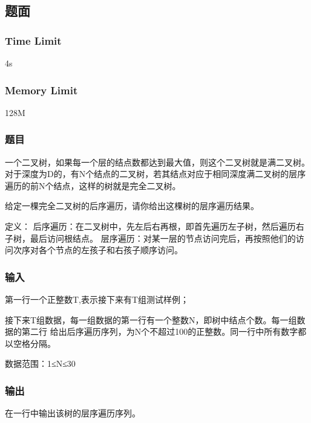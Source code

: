 \subsection{题面}

\subsubsection{Time Limit}
4s

\subsubsection{Memory Limit}
128M

\subsubsection{题目}
一个二叉树，如果每一个层的结点数都达到最大值，则这个二叉树就是满二叉树。对于深度为D的，有N个结点的二叉树，若其结点对应于相同深度满二叉树的层序遍历的前N个结点，这样的树就是完全二叉树。

给定一棵完全二叉树的后序遍历，请你给出这棵树的层序遍历结果。

定义：
后序遍历：在二叉树中，先左后右再根，即首先遍历左子树，然后遍历右子树，最后访问根结点。
层序遍历：对某一层的节点访问完后，再按照他们的访问次序对各个节点的左孩子和右孩子顺序访问。

\subsubsection{输入}
第一行一个正整数T,表示接下来有T组测试样例；

接下来T组数据，每一组数据的第一行有一个整数N，即树中结点个数。每一组数据的第二行
给出后序遍历序列，为N个不超过100的正整数。同一行中所有数字都以空格分隔。

数据范围：1≤N≤30

\subsubsection{输出}
在一行中输出该树的层序遍历序列。

